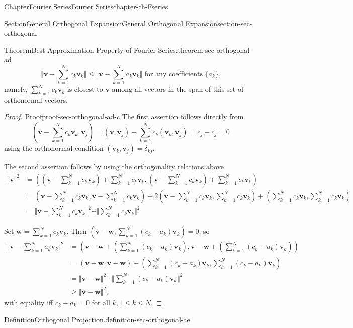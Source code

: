 \documentclass[oneside,10pt,]{book}
\numberwithin{equation}{section}
\newcommand{\bv}{\mathbf{v}}
\newcommand{\bw}{\mathbf{w}}
\newcommand{\amp}{&}
\begin{document}
\begin{chapterptx}{Chapter}{Fourier Series}{}{Fourier Series}{}{}{chapter-ch-Fseries}
\begin{sectionptx}{Section}{General Orthogonal Expansion}{}{General Orthogonal Expansion}{}{}{section-sec-orthogonal}
\begin{theorem}{Theorem}{Best Approximation Property of Fourier Series.}{}{theorem-sec-orthogonal-ad}
\begin{equation*}
\Vert \bv - \sum_{k=1}^{N} c_{k} \bv_{k}\Vert \le \Vert \bv - \sum_{k=1}^{N} a_{k} \bv_{k}\Vert 
\text{ for any coefficients $\{a_{k}\}$,}
\end{equation*}
namely, \(\sum_{k=1}^{N} c_{k} \bv_{k}\) is closest to \(\bv\) among all vectors in the span of this set of orthonormal vectors.\end{theorem}
\begin{proof}{Proof}{}{proof-sec-orthogonal-ad-c}
The first assertion follows directly from%
\begin{equation*}
( \bv - \sum_{k=1}^{N} c_{k} \bv_{k}, \bv_{j})=(\bv, \bv_{j})- \sum_{k=1}^{N} c_{k} (\bv_{k}, \bv_{j})=c_{j}-c_{j}=0
\end{equation*}
using the orthonormal condition \((\bv_{k}, \bv_{j})=\delta_{kj}\).%
\par
The second assertion follows by using  the orthogonality relations above%
\begin{align*}
\Vert \bv \Vert^{2} \amp =   \left( (\bv - \sum_{k=1}^{N} c_{k} \bv_{k})+  \sum_{k=1}^{N} c_{k} \bv_{k},
(\bv - \sum_{k=1}^{N} c_{k} \bv_{k})+  \sum_{k=1}^{N} c_{k} \bv_{k} \right)\\
\amp = (  \bv - \sum_{k=1}^{N} c_{k} \bv_{k},  \bv - \sum_{k=1}^{N} c_{k} \bv_{k})+
2(\bv - \sum_{k=1}^{N} c_{k} \bv_{k},  \sum_{k=1}^{N} c_{k} \bv_{k})+
(\sum_{k=1}^{N} c_{k} \bv_{k},\sum_{k=1}^{N} c_{k} \bv_{k})\\
\amp = \Vert \bv - \sum_{k=1}^{N} c_{k} \bv_{k}\Vert^{2}+ \Vert \sum_{k=1}^{N} c_{k} \bv_{k}\Vert^{2}
\end{align*}
%
\par
Set \(\bw = \sum_{k=1}^{N} c_{k} \bv_{k}\). Then \((\bv-\bw, \sum_{k=1}^{N} (c_{k}-a_{k}) \bv_{k})=0\), so%
\begin{align*}
\Vert \bv - \sum_{k=1}^{N} a_{k} \bv_{k}\Vert^{2} \amp =   \left(\bv-\bw +( \sum_{k=1}^{N} (c_{k}-a_{k}) \bv_{k}),
\bv-\bw +( \sum_{k=1}^{N} (c_{k}-a_{k}) \bv_{k})\right)\\
\amp = \left(\bv-\bw, \bv-\bw\right)+ \left(\sum_{k=1}^{N} (c_{k}-a_{k}) \bv_{k},\sum_{k=1}^{N} (c_{k}-a_{k}) \bv_{k}\right)\\
\amp = \Vert \bv-\bw\Vert^{2}+\Vert \sum_{k=1}^{N} (c_{k}-a_{k}) \bv_{k}\Vert^{2}\\
\amp \ge \Vert \bv-\bw\Vert^{2},
\end{align*}
with equality iff \(c_{k}-a_{k}=0\) for all \(k, 1\le k \le N\).%
\end{proof}
\begin{definition}{Definition}{Orthogonal Projection.}{definition-sec-orthogonal-ae}%

\end{definition}
\end{sectionptx}
\end{chapterptx}
\end{document}
